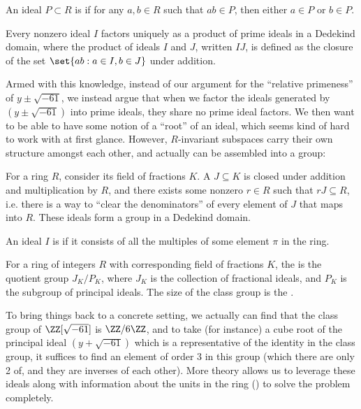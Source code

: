 \documentclass[12pt]{article}
\begin{document}
\begin{definition*}
  An ideal $P \subset R$ is  if for any $a, b \in R$ such that $ab
  \in P$, then either $a \in P$ or $b \in P$.   
\end{definition*}
\begin{theorem*}
  Every nonzero ideal $I$ factors uniquely as a product of prime ideals in a
  Dedekind domain, where the product of ideals $I$ and $J$, written $IJ$, is defined as the
  closure of the set $\set{ab : a \in I, b\in J}$ under addition.  
\end{theorem*}
Armed with this knowledge, instead of our argument for the ``relative
primeness'' of $y \pm \sqrt{-61}$, we instead argue that when we factor the
ideals generated by $(y \pm \sqrt{-61})$ into
prime ideals, they share no prime ideal factors. We then want to be able to have
some notion of a ``root'' of an ideal, which seems kind of hard to work with at
first glance. However, $R$-invariant subspaces carry their own structure amongst
each other, and actually can be assembled into a group: 
\begin{definition*}
  For a ring $R$, consider its field of fractions $K$. A 
  $J \subseteq K$ is closed under addition and  multiplication by $R$, and there exists some nonzero $r \in R$ such that $rJ
  \subseteq R$, i.e. there is a way to ``clear the denominators'' of
  every element of $J$ that maps into $R$. These ideals form a group in a
  Dedekind domain. 
\end{definition*}
\begin{definition*}
  An ideal $I$ is  if it consists of all the multiples of some
  element $\pi$ in the ring.  
\end{definition*}
\begin{definition*}
  For a ring of integers $R$ with corresponding field of fractions $K$, the
   is the quotient group $J_K / P_K$, where $J_K$ is the
  collection of fractional ideals, and $P_K$ is the subgroup of principal
  ideals. The size of the class group is the . 
\end{definition*}
To bring things back to a concrete setting, we actually can find that the class
group of $\ZZ[\sqrt{-61}]$ is $\ZZ / 6 \ZZ$, and to take (for instance) a cube
root of the principal ideal $(y + \sqrt{-61})$ which is a representative of the
identity in the class group, it suffices to find an element
of order 3 in this group (which there are only 2 of, and they are inverses of
each other). More theory allows us to leverage these ideals along with
information about the units in the ring () to solve the problem completely.  
\end{document}
